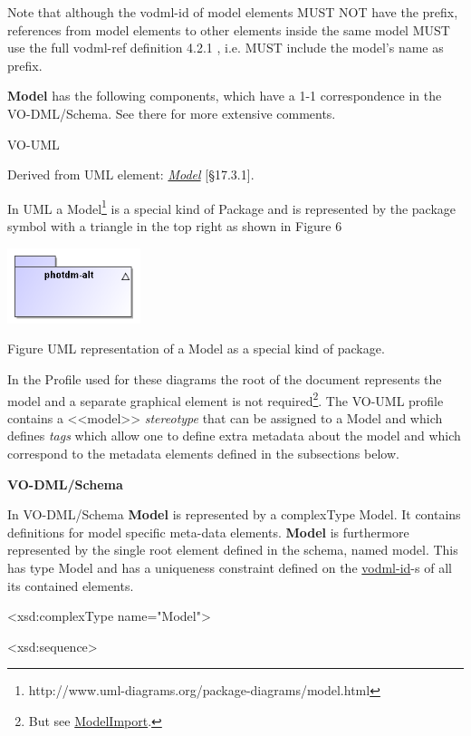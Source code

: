 \documentclass[10pt,a4paper]{ivoa}
\begin{document}
Note that although the vodml-id of model elements MUST NOT have the
prefix, references from model elements to other elements inside the same
model MUST use the full vodml-ref definition 4.2.1 , i.e. MUST include
the model's name as prefix.

\textbf{Model} has the following components, which have a 1-1
correspondence in the VO-DML/Schema. See there for more extensive
comments.

VO-UML

Derived from UML element:
\href{http://www.uml-diagrams.org/package-diagrams/model.html}{\emph{Model}}
{[}§17.3.1{]}.

In UML a Model\footnote{http://www.uml-diagrams.org/package-diagrams/model.html}
is a special kind of Package and is represented by the package symbol
with a triangle in the top right as shown in Figure 6

\includegraphics[width=1.53333in,height=0.86667in]{./media/image9.png}

Figure UML representation of a Model as a special kind of package.

In the Profile used for these diagrams the root of the document
represents the model and a separate graphical element is not
required\footnote{But see \protect\hyperlink{ModelImport}{ModelImport}.}.
The VO-UML profile contains a
\textless\textless model\textgreater\textgreater{} \emph{stereotype}
that can be assigned to a Model and which defines \emph{tags} which
allow one to define extra metadata about the model and which correspond
to the metadata elements defined in the subsections below.

\textbf{VO-DML/Schema}

In VO-DML/Schema \textbf{Model} is represented by a complexType Model.
It contains definitions for model specific meta-data elements.
\textbf{Model} is furthermore represented by the single root element
defined in the schema, named model. This has type Model and has a
uniqueness constraint defined on the
\protect\hyperlink{vodml-id-vodmlid-1}{vodml-id}-s of all its contained
elements.

\textless xsd:complexType name="Model"\textgreater{}

\textless xsd:sequence\textgreater{}
\end{document}
